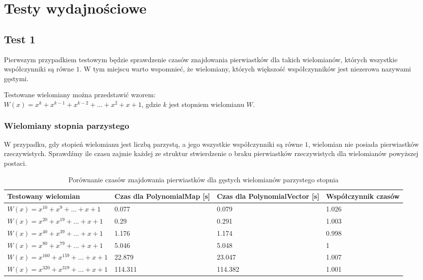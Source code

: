 \section{Testy wydajnościowe}



\subsection{Test 1}

Pierwszym przypadkiem testowym będzie sprawdzenie czasów znajdowania pierwiastków dla takich wielomianów, których wszystkie współczynniki są równe $1$. W tym miejscu warto wspomnieć, że wielomiany, których większość współczynników jest niezerowa nazywami gęstymi.

Testowane wielomiany można przedstawić wzorem: \\
$W(x) = x^k + x^{k-1} + x^{k-2} + ... + x^2 + x + 1$, gdzie $k$ jest stopniem wielomianu $W$.

\subsubsection{Wielomiany stopnia parzystego}

W przypadku, gdy stopień wielomianu jest liczbą parzystą, a jego wszystkie współczynniki są równe $1$, wielomian nie posiada pierwiastków rzeczywistych. Sprawdźmy ile czasu zajmie każdej ze struktur stwierdzenie o braku pierwiastków rzeczywistych dla wielomianów powyższej postaci.

\begin{table}[H]
	\begin{tabular}{ |p{4cm}|p{2.75cm}|p{2.75cm}|p{3.5cm}|} 
		\hline
		Testowany wielomian & Czas dla PolynomialMap [s] & Czas dla PolynomialVector [s] & Współczynnik czasów \\
		\hline
		$W(x) = x^{10} + x^9 + ... + x + 1$ & 0.077 & 0.079 & 1.026 \\
		$W(x) = x^{20} + x^{19} + ... + x + 1$ & 0.29 & 0.291 & 1.003 \\
		$W(x) = x^{40} + x^{39} + ... + x + 1$ & 1.176 & 1.174 & 0.998 \\
		$W(x) = x^{80} + x^{79} + ... + x + 1$ & 5.046 & 5.048 & 1 \\
		$W(x) = x^{160} + x^{159} + ... + x + 1$  & 22.879 & 23.047 & 1.007 \\
		$W(x) = x^{320} + x^{319} + ... + x + 1$  & 114.311 & 114.382 & 1.001 \\
		\hline
	\end{tabular}
	\caption{Porównanie czasów znajdowania pierwiastków dla gęstych wielomianów parzystego stopnia}
\end{table}

